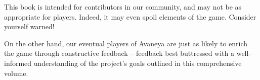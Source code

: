 This book is intended for contributors in our community, and may not be as appropriate for players. Indeed, it may even spoil elements of the game. Consider yourself warned!

On the other hand, our eventual players of Avaneya are just as likely to enrich the game through constructive feedback -- feedback best buttressed with a well--informed understanding of the project's goals outlined in this comprehensive volume. 

\StopChapter
